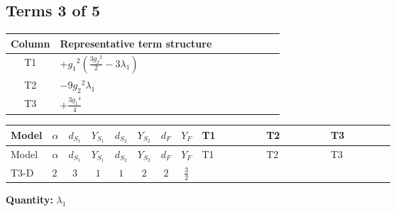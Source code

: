 \documentclass[8pt]{article}
\begin{document}
\begin{landscape}
\subsection*{Terms 3 of 5}
\begin{center}
\begin{tabular}{@{}c >{\raggedright\arraybackslash}p{0.82\linewidth}@{}}
\toprule
Column & Representative term structure \\
\midrule
T1 & \(\displaystyle +{g_1}^2 \left(\frac{3 {g_2}^2}{2}-3 {\lambda_1}\right)\) \\
\midrule
T2 & \(\displaystyle -9 {g_2}^2 {\lambda_1}\) \\
\midrule
T3 & \(\displaystyle +\frac{3 {g_1}^4}{4}\) \\
\midrule
\bottomrule
\end{tabular}
\end{center}
\smallskip
\tiny
\begin{longtable}{@{}llcccccc >{\raggedright\arraybackslash}p{0.21\linewidth} >{\raggedright\arraybackslash}p{0.21\linewidth} >{\raggedright\arraybackslash}p{0.21\linewidth}@{}}
\toprule
Model & $\alpha$ & $d_{S_1}$ & $Y_{S_1}$ & $d_{S_2}$ & $Y_{S_2}$ & $d_F$ & $Y_F$ & T1 & T2 & T3 \\
\midrule
\endfirsthead
\toprule
Model & $\alpha$ & $d_{S_1}$ & $Y_{S_1}$ & $d_{S_2}$ & $Y_{S_2}$ & $d_F$ & $Y_F$ & T1 & T2 & T3 \\
\midrule
\endhead
T3-D & $2$ & $3$ & $1$ & $1$ & $2$ & $2$ & $\frac{3}{2}$ & \scriptsize\adjustbox{max width=\linewidth}{$\begin{gathered} +{g_1}^2 \left(\frac{3 {g_2}^2}{2}-3 {\lambda_1}\right)\end{gathered}$} & \scriptsize\adjustbox{max width=\linewidth}{$\begin{gathered} -9 {g_2}^2 {\lambda_1}\end{gathered}$} & \scriptsize\adjustbox{max width=\linewidth}{$\begin{gathered} +\frac{3 {g_1}^4}{4}\end{gathered}$} \\
\midrule
\bottomrule
\end{longtable}
\clearpage
\noindent\textbf{Quantity: }$\lambda_1$\par\smallskip

\end{landscape}
\end{document}
